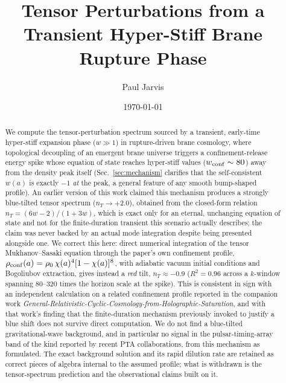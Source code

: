 \documentclass[twocolumn, PRD, amsmath, amssymb, aps, nofootinbib]{revtex4-2}
\begin{document}
\title{Tensor Perturbations from a Transient Hyper-Stiff Brane Rupture Phase}
\author{Paul Jarvis}
\date{\today}

\begin{abstract}
We compute the tensor-perturbation spectrum sourced by a transient, early-time hyper-stiff expansion phase ($w \gg 1$) in rupture-driven brane cosmology, where topological decoupling of an emergent brane universe triggers a confinement-release energy spike whose equation of state reaches hyper-stiff values ($w_{\rm conf}\sim80$) away from the density peak itself (Sec.~\ref{sec:mechanism} clarifies that the self-consistent $w(a)$ is exactly $-1$ \emph{at} the peak, a general feature of any smooth bump-shaped profile). An earlier version of this work claimed this mechanism produces a strongly blue-tilted tensor spectrum ($n_T\to+2.0$), obtained from the closed-form relation $n_T=(6w-2)/(1+3w)$, which is exact only for an eternal, unchanging equation of state and not for the finite-duration transient this scenario actually describes; the claim was never backed by an actual mode integration despite being presented alongside one. We correct this here: direct numerical integration of the tensor Mukhanov--Sasaki equation through the paper's own confinement profile, $\rho_{\rm conf}(a)=\rho_0\,\chi(a)^4[1-\chi(a)]^8$, with adiabatic vacuum initial conditions and Bogoliubov extraction, gives instead a \emph{red} tilt, $n_T\approx-0.9$ ($R^2=0.96$ across a $k$-window spanning 80--320 times the horizon scale at the spike). This is consistent in sign with an independent calculation on a related confinement profile reported in the companion work \emph{General-Relativistic-Cyclic-Cosmology-from-Holographic-Saturation}, and with that work's finding that the finite-duration mechanism previously invoked to justify a blue shift does not survive direct computation. We do not find a blue-tilted gravitational-wave background, and in particular no signal in the pulsar-timing-array band of the kind reported by recent PTA collaborations, from this mechanism as formulated. The exact background solution and its rapid dilution rate are retained as correct pieces of algebra internal to the assumed profile; what is withdrawn is the tensor-spectrum prediction and the observational claims built on it.
\end{abstract}

\maketitle
\end{document}
